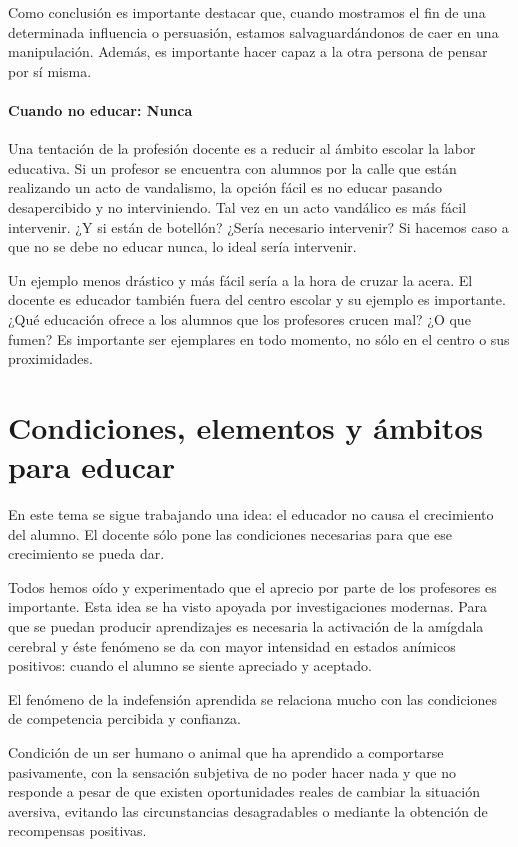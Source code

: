 Como conclusión es importante destacar que, cuando mostramos el fin de una determinada influencia o persuasión, estamos salvaguardándonos de caer en una manipulación.
%
Además, es importante hacer capaz a la otra persona de pensar por sí misma. 



\paragraph{Cuando no educar: Nunca}
Una tentación de la profesión docente es a reducir al ámbito escolar la labor educativa.
%
Si un profesor se encuentra con alumnos por la calle que están realizando un acto de vandalismo, la opción fácil es no educar pasando desapercibido y no interviniendo.
%
Tal vez en un acto vandálico es más fácil intervenir.
%
¿Y si están de botellón? ¿Sería necesario intervenir? 
%
Si hacemos caso a que no se debe no educar nunca, lo ideal sería intervenir.

Un ejemplo menos drástico y más fácil sería a la hora de cruzar la acera. 
%
El docente es educador también fuera del centro escolar y su ejemplo es importante.
%
¿Qué educación ofrece a los alumnos que los profesores crucen mal? 
%
¿O que fumen?
%
Es importante ser ejemplares en todo momento, no sólo en el centro o sus proximidades.




\newpage
\section{Condiciones, elementos y ámbitos para educar}

En este tema se sigue trabajando una idea: el educador no causa el crecimiento del alumno. 
%
El docente sólo pone las condiciones necesarias para que ese crecimiento se pueda dar.

Todos hemos oído y experimentado que el aprecio por parte de los profesores es importante. 
%
Esta idea se ha visto apoyada por investigaciones modernas. 
%
Para que se puedan producir aprendizajes es necesaria la activación de la amígdala cerebral y éste fenómeno se da con mayor intensidad en estados anímicos positivos: cuando el alumno se siente apreciado y aceptado.

El fenómeno de la indefensión aprendida se relaciona mucho con las condiciones de competencia percibida y confianza.

\begin{defn}
Condición de un ser humano o animal que ha aprendido a comportarse pasivamente, con la sensación subjetiva de no poder hacer nada y que no responde a pesar de que existen oportunidades reales de cambiar la situación aversiva, evitando las circunstancias desagradables o mediante la obtención de recompensas positivas.
\end{defn}

